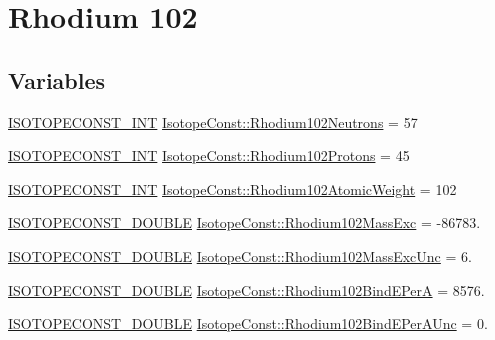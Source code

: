 \hypertarget{group___isotope_const-_rhodium-_rh102}{}\section{Rhodium 102}
\label{group___isotope_const-_rhodium-_rh102}
\subsection*{Variables}
\begin{DoxyCompactItemize}
\item 
\mbox{\hyperlink{group___isotope_const-_macros_ga5f18360b3e99483a35c32d789e62621c}{I\+S\+O\+T\+O\+P\+E\+C\+O\+N\+S\+T\+\_\+\+I\+NT}} \mbox{\hyperlink{group___isotope_const-_rhodium-_rh102_ga0a59b7abea96fc06b208d39e00b137dc}{Isotope\+Const\+::\+Rhodium102\+Neutrons}} = 57
\item 
\mbox{\hyperlink{group___isotope_const-_macros_ga5f18360b3e99483a35c32d789e62621c}{I\+S\+O\+T\+O\+P\+E\+C\+O\+N\+S\+T\+\_\+\+I\+NT}} \mbox{\hyperlink{group___isotope_const-_rhodium-_rh102_ga85660c6b64a1733313d85e3eb7ee130f}{Isotope\+Const\+::\+Rhodium102\+Protons}} = 45
\item 
\mbox{\hyperlink{group___isotope_const-_macros_ga5f18360b3e99483a35c32d789e62621c}{I\+S\+O\+T\+O\+P\+E\+C\+O\+N\+S\+T\+\_\+\+I\+NT}} \mbox{\hyperlink{group___isotope_const-_rhodium-_rh102_ga5048de07c6da90f6232b2d249ec1c2e3}{Isotope\+Const\+::\+Rhodium102\+Atomic\+Weight}} = 102
\item 
\mbox{\hyperlink{group___isotope_const-_macros_ga8f45a7272ce02c0b4c65c44636ed719a}{I\+S\+O\+T\+O\+P\+E\+C\+O\+N\+S\+T\+\_\+\+D\+O\+U\+B\+LE}} \mbox{\hyperlink{group___isotope_const-_rhodium-_rh102_ga63e8f36a9c13f679e05230ca6e1bffdd}{Isotope\+Const\+::\+Rhodium102\+Mass\+Exc}} = -\/86783.
\item 
\mbox{\hyperlink{group___isotope_const-_macros_ga8f45a7272ce02c0b4c65c44636ed719a}{I\+S\+O\+T\+O\+P\+E\+C\+O\+N\+S\+T\+\_\+\+D\+O\+U\+B\+LE}} \mbox{\hyperlink{group___isotope_const-_rhodium-_rh102_ga05e366e16b6328994dbfc90de1e93c1f}{Isotope\+Const\+::\+Rhodium102\+Mass\+Exc\+Unc}} = 6.
\item 
\mbox{\hyperlink{group___isotope_const-_macros_ga8f45a7272ce02c0b4c65c44636ed719a}{I\+S\+O\+T\+O\+P\+E\+C\+O\+N\+S\+T\+\_\+\+D\+O\+U\+B\+LE}} \mbox{\hyperlink{group___isotope_const-_rhodium-_rh102_ga6d8ba226691b902e328c3a8c2350e1eb}{Isotope\+Const\+::\+Rhodium102\+Bind\+E\+PerA}} = 8576.
\item 
\mbox{\hyperlink{group___isotope_const-_macros_ga8f45a7272ce02c0b4c65c44636ed719a}{I\+S\+O\+T\+O\+P\+E\+C\+O\+N\+S\+T\+\_\+\+D\+O\+U\+B\+LE}} \mbox{\hyperlink{group___isotope_const-_rhodium-_rh102_ga25e43cd5f70af317f37a79721d9c9bd2}{Isotope\+Const\+::\+Rhodium102\+Bind\+E\+Per\+A\+Unc}} = 0.

\end{DoxyCompactItemize}
